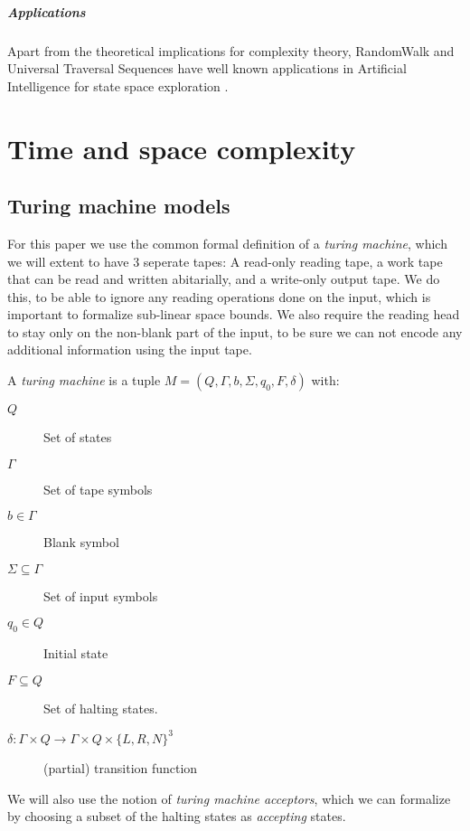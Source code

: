 \paragraph{Applications}\label{applications}

Apart from the theoretical implications for complexity theory,
RandomWalk and Universal Traversal Sequences have well known
applications in Artificial Intelligence for state space exploration
.

\chapter{Time and space complexity}\label{time-and-space-complexity}

\section{Turing machine models}\label{turing-machine-models}

For this paper we use the common formal definition of a \emph{turing
machine}, which we will extent to have 3 seperate tapes: A read-only
reading tape, a work tape that can be read and written abitarially, and
a write-only output tape. We do this, to be able to ignore any reading
operations done on the input, which is important to formalize sub-linear
space bounds. We also require the reading head to stay only on the
non-blank part of the input, to be sure we can not encode any additional
information using the input tape.

A \emph{turing machine} is a tuple
$M = \left( Q, \Gamma, b, \Sigma, q_0, F, \delta \right)$ with:

\begin{description}
\item[$Q$]
Set of states
\item[$\Gamma$]
Set of tape symbols
\item[$b \in \Gamma$]
Blank symbol
\item[$\Sigma \subseteq \Gamma$]
Set of input symbols
\item[$q_0 \in Q$]
Initial state
\item[$F \subseteq Q$]
Set of halting states.
\item[$\delta : \Gamma \times Q \longrightarrow \Gamma \times Q \times \{L, R, N\}^3$]
(partial) transition function
\end{description}

We will also use the notion of \emph{turing machine acceptors}, which we
can formalize by choosing a subset of the halting states as
\emph{accepting} states.

